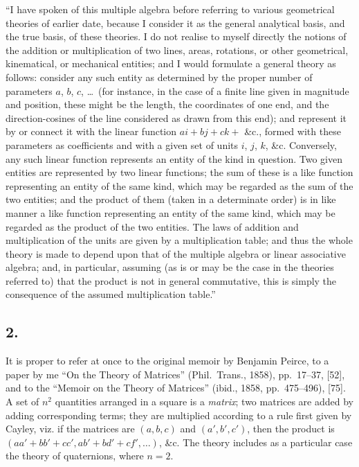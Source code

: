 \documentclass[11pt,a4paper]{book}
\begin{document}
``I have spoken of this multiple algebra before referring to various geometrical theories of earlier date, because I consider it as the general analytical basis, and the true basis, of these theories. I do not realise to myself directly the notions of the addition or multiplication of two lines, areas, rotations, or other geometrical, kinematical, or mechanical entities; and I would formulate a general theory as follows: consider any such entity as determined by the proper number of parameters $a$, $b$, $c$, \ldots\ (for instance, in the case of a finite line given in magnitude and position, these might be the length, the coordinates of one end, and the direction-cosines of the line considered as drawn from this end); and represent it by or connect it with the linear function $ai + bj + ck +$ \&c., formed with these parameters as coefficients and with a given set of units $i$, $j$, $k$, \&c. Conversely, any such linear function represents an entity of the kind in question. Two given entities are represented by two linear functions; the sum of these is a like function representing an entity of the same kind, which may be regarded as the sum of the two entities; and the product of them (taken in a determinate order) is in like manner a like function representing an entity of the same kind, which may be regarded as the product of the two entities. The laws of addition and multiplication of the units are given by a multiplication table; and thus the whole theory is made to depend upon that of the multiple algebra or linear associative algebra; and, in particular, assuming (as is or may be the case in the theories referred to) that the product is not in general commutative, this is simply the consequence of the assumed multiplication table.''

\subsection*{2.}

It is proper to refer at once to the original memoir by Benjamin Peirce, to a paper by me ``On the Theory of Matrices'' (Phil.\ Trans., 1858), pp.~17--37, [52], and to the ``Memoir on the Theory of Matrices'' (ibid., 1858, pp.~475--496), [75]. A set of $n^2$ quantities arranged in a square is a \textit{matrix}; two matrices are added by adding corresponding terms; they are multiplied according to a rule first given by Cayley, viz. if the matrices are $(a, b, c)$ and $(a', b', c')$, then the product is $(aa' + bb' + cc', ab' + bd' + cf', \ldots)$, \&c. The theory includes as a particular case the theory of quaternions, where $n = 2$.
\end{document}
